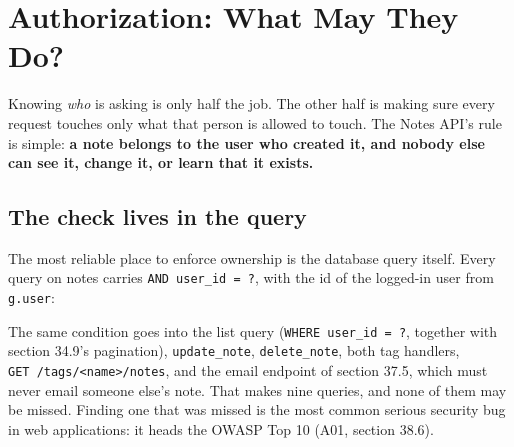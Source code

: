 \setcounter{section}{3}
\section{Authorization: What May They Do?}\label{38-security:384-authorization-what-may-they-do}

Knowing \emph{who} is asking is only half the job. The other half is making sure every request touches only what that person is allowed to touch. The Notes API's rule is simple: \textbf{a note belongs to the user who created it, and nobody else can see it, change it, or learn that it exists.}

\subsection*{The check lives in the query}\label{38-security:the-check-lives-in-the-query}

The most reliable place to enforce ownership is the database query itself. Every query on notes carries \texttt{AND\ user\_id\ =\ ?}, with the id of the logged-in user from \texttt{g.user}:

\begin{codebox}[short]

\begin{Shaded}
\begin{Highlighting}[]
\NormalTok{    ),}
\NormalTok{    (content, g.user[}\NormalTok{]),}
\NormalTok{)}

\NormalTok{),}
\NormalTok{    (note\_id, g.user[}\NormalTok{]),}
\NormalTok{)}
\end{Highlighting}
\end{Shaded}

\end{codebox}

\noindent{}The same condition goes into the list query (\texttt{WHERE\ user\_id\ =\ ?}, together with section 34.9's pagination), \texttt{update\_note}, \texttt{delete\_note}, both tag handlers, \texttt{GET\ /}\allowbreak{}\texttt{tags/}\allowbreak{}\texttt{\textless{}name\textgreater{}/}\allowbreak{}\texttt{notes}, and the email endpoint of section 37.5, which must never email someone else's note. That makes nine queries, and none of them may be missed. Finding one that was missed is the most common serious security bug in web applications: it heads the OWASP Top 10 (A01, section 38.6).

